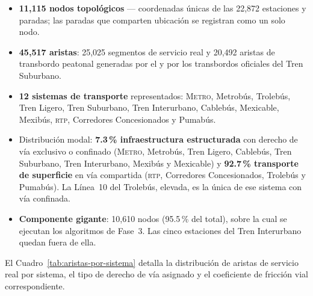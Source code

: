 \begin{itemize}
    \item \textbf{11{,}115 nodos topológicos} — coordenadas únicas de las
    22{,}872 estaciones y paradas; las paradas que comparten ubicación se
    registran como un solo nodo.
    \item \textbf{45{,}517 aristas}: 25{,}025 segmentos de servicio real y
    20{,}492 aristas de transbordo peatonal generadas por el
     y por los transbordos oficiales del
    Tren Suburbano.
    \item \textbf{12 sistemas de transporte} representados: \textsc{Metro},
    Metrobús, Trolebús, Tren Ligero, Tren Suburbano, Tren Interurbano,
    Cablebús, Mexicable, Mexibús, \textsc{rtp}, Corredores Concesionados y
    Pumabús.
    \item Distribución modal: \textbf{7.3\,\% infraestructura estructurada}
    con derecho de vía exclusivo o confinado (\textsc{Metro}, Metrobús, Tren
    Ligero, Cablebús, Tren Suburbano, Tren Interurbano, Mexibús y Mexicable) y
    \textbf{92.7\,\% transporte de superficie} en vía compartida
    (\textsc{rtp}, Corredores Concesionados, Trolebús y Pumabús). La Línea~10
    del Trolebús, elevada, es la única de ese sistema con vía confinada.
    \item \textbf{Componente gigante}: 10{,}610 nodos (95.5\,\% del total),
    sobre la cual se ejecutan los algoritmos de Fase~3. Las cinco estaciones
    del Tren Interurbano quedan fuera de ella.
\end{itemize}

El Cuadro~\ref{tab:aristas-por-sistema} detalla la distribución de aristas de
servicio real por sistema, el tipo de derecho de vía asignado y el coeficiente
de fricción vial correspondiente.

